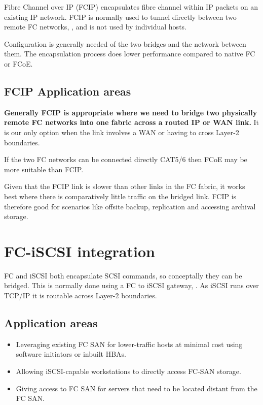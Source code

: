 \documentclass[slides]{pgnotes}
\begin{document}
Fibre Channel over IP (FCIP) encapsulates fibre channel within IP
packets on an existing IP network. FCIP is normally used to tunnel
directly between two remote FC networks, , and is not used by individual
hosts.


Configuration is generally needed of the two bridges and the network
between them. The encapsulation process does lower performance compared
to native FC or FCoE.

\subsection{FCIP Application areas}
\label{sec:fcip-application-areas}

\textbf{Generally FCIP is appropriate where we need to bridge two
physically remote FC networks into one fabric across a routed IP or WAN
link.} It is our only option when the link involves a WAN or having to
cross Layer-2 boundaries.

If the two FC networks can be connected directly CAT5/6 then FCoE may be
more suitable than FCIP.

Given that the FCIP link is slower than other links in the FC fabric, it
works best where there is comparatively little traffic on the bridged
link. FCIP is therefore good for scenarios like offsite backup,
replication and accessing archival storage.

\section{FC-iSCSI integration}
\label{sec:fc-iscsi-integration}

FC and iSCSI both encapsulate SCSI commands, so conceptally they can be
bridged. This is normally done using a FC to iSCSI gateway, . As iSCSI
runs over TCP/IP it is routable across Layer-2 boundaries.


\subsection{Application areas}
\label{sec:application-areas}

\begin{itemize}
\item
  Leveraging existing FC SAN for lower-traffic hosts at minimal cost
  using software initiators or inbuilt HBAs.
\item
  Allowing iSCSI-capable workstations to directly access FC-SAN storage.
\item
  Giving access to FC SAN for servers that need to be located distant
  from the FC SAN.
\end{itemize}
\end{document}

